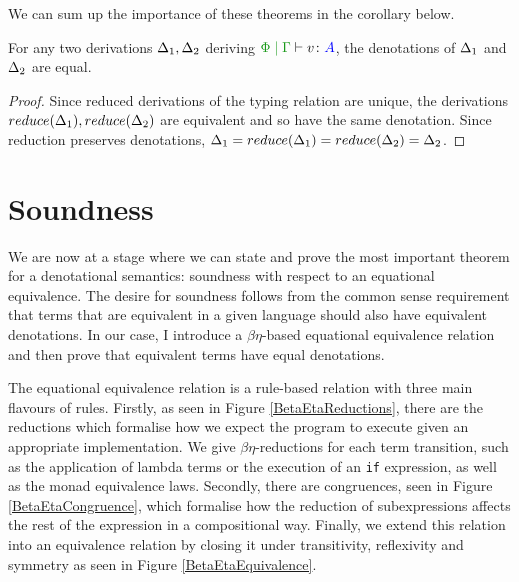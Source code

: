 We can sum up the importance of these theorems in the corollary below.

\begin{framed}
    \begin{corollary}\label{DenotationsAreUnique}
      For any two derivations $\Delta_1, \Delta_2$ deriving $\gpetyperelation{v}{A}$, the denotations of $\Delta_1$ and $\Delta_2$ are equal.
    \end{corollary}

    \begin{proof}
        Since reduced derivations of the typing relation are unique, the derivations $reduce(\Delta_1), reduce(\Delta_2)$ are equivalent and so have the same denotation. Since reduction preserves denotations, $\Delta_1 = reduce(\Delta_1) = reduce(\Delta_2) = \Delta_2$.
    \end{proof}
\end{framed}

\section{Soundness}
\label{SoundnessDefinition}
We are now at a stage where we can state and prove the most important theorem for a denotational semantics: soundness with respect to an equational equivalence. The desire for soundness follows from the common sense requirement that terms that are equivalent in a given language should also have equivalent denotations. In our case, I introduce a $\beta\eta$-based equational equivalence relation and then prove that equivalent terms have equal denotations.

The equational equivalence relation is a rule-based relation with three main flavours of rules. Firstly, as seen in Figure \ref{BetaEtaReductions}, there are the reductions which formalise how we expect the program to execute given an appropriate implementation. We give $\beta\eta$-reductions for each term transition, such as the application of lambda terms or the execution of an \texttt{if} expression, as well as the monad equivalence laws. Secondly, there are congruences, seen in Figure \ref{BetaEtaCongruence}, which formalise how the reduction of subexpressions affects the rest of the expression in a compositional way. Finally, we extend this relation into an equivalence relation by closing it under transitivity, reflexivity and symmetry as seen in Figure \ref{BetaEtaEquivalence}.

